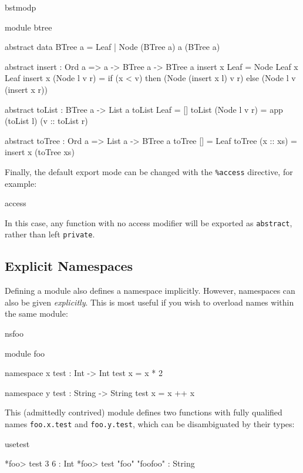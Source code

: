 \begin{SaveVerbatim}{bstmodp}

module btree

abstract data BTree a = Leaf
                      | Node (BTree a) a (BTree a)

abstract
insert : Ord a => a -> BTree a -> BTree a
insert x Leaf = Node Leaf x Leaf
insert x (Node l v r) = if (x < v) then (Node (insert x l) v r)
                                   else (Node l v (insert x r))

abstract
toList : BTree a -> List a
toList Leaf = []
toList (Node l v r) = app (toList l) (v :: toList r)

abstract
toTree : Ord a => List a -> BTree a
toTree [] = Leaf
toTree (x :: xs) = insert x (toTree xs)

\end{SaveVerbatim}

\noindent
Finally, the default export mode can be changed with the \texttt{\%access} directive,
for example:

\begin{SaveVerbatim}{access}


\end{SaveVerbatim}

\noindent
In this case, any function with no access modifier will be exported as \texttt{abstract},
rather than left \texttt{private}.

\subsection{Explicit Namespaces}

Defining a module also defines a namespace implicitly. However, namespaces can also
be given \emph{explicitly}. This is most useful if you wish to overload names within
the same module:

\begin{SaveVerbatim}{nsfoo}

module foo

namespace x
  test : Int -> Int
  test x = x * 2

namespace y
  test : String -> String
  test x = x ++ x 

\end{SaveVerbatim}

\noindent
This (admittedly contrived) module defines two functions with fully qualified names
\texttt{foo.x.test} and \texttt{foo.y.test}, which can be disambiguated by their
types:

\begin{SaveVerbatim}{usetest}

*foo> test 3 
6 : Int
*foo> test "foo" 
"foofoo" : String

\end{SaveVerbatim}

